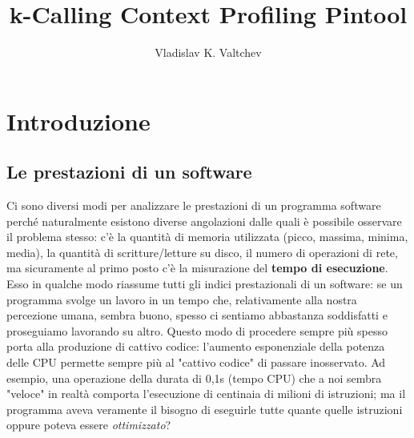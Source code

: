 \documentclass[a4paper,11pt]{report}
\author{Vladislav K. Valtchev}
\title{k-Calling Context Profiling Pintool}
\begin{document}
\maketitle

\chapter{Introduzione}
\section{Le prestazioni di un software}

Ci sono diversi modi per analizzare le prestazioni di un programma software perché naturalmente
esistono diverse angolazioni dalle quali è possibile osservare il problema stesso: 
c'è la quantità di memoria utilizzata (picco, massima, minima, media), la quantità 
di scritture/letture su disco, il numero di operazioni di rete, ma sicuramente
al primo posto c'è la misurazione del \textbf{tempo di esecuzione}. 
Esso in qualche modo riassume tutti gli indici prestazionali di un software: 
se un programma svolge un lavoro in un tempo che, relativamente alla nostra percezione umana,
sembra buono, spesso ci sentiamo abbastanza soddisfatti e proseguiamo lavorando su altro.
Questo modo di procedere sempre più spesso porta alla produzione di cattivo codice: l'aumento esponenziale della potenza delle CPU permette sempre più al "cattivo codice" di passare 
inosservato. Ad esempio, una operazione della durata di 0,1s (tempo CPU) che a noi sembra "veloce" 
in realtà comporta l'esecuzione di centinaia di milioni di istruzioni; ma il programma aveva 
veramente il bisogno di eseguirle tutte quante quelle istruzioni oppure poteva essere \emph{ottimizzato}?
\end{document}
